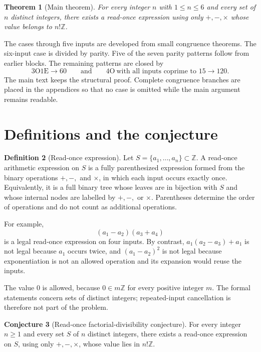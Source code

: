 \documentclass[11pt]{amsart}
\newtheorem{theorem}{Theorem}[section]
\theoremstyle{definition}
\newtheorem{definition}[theorem]{Definition}
\newtheorem{conjecture}[theorem]{Conjecture}
\theoremstyle{remark}
\newcommand{\Z}{\mathbb Z}
\newcommand{\OO}{\mathrm O}
\newcommand{\EE}{\mathrm E}
\begin{document}
\begin{theorem}[Main theorem]\label{thm:main}
For every integer $n$ with $1\le n\le6$ and every set of $n$ distinct
integers, there exists a read-once expression using only $+,-,\times$ whose
value belongs to $n!\Z$.
\end{theorem}

The cases through five inputs are developed from small congruence theorems.
The six-input case is divided by parity.  Five of the seven parity patterns
follow from earlier blocks.  The remaining patterns are closed by
\[
  3\OO1\EE\to 60
  \qquad\text{and}\qquad
  4\OO\ \text{with all inputs coprime to }15\to120.
\]
The main text keeps the structural proof.  Complete congruence branches are
placed in the appendices so that no case is omitted while the main argument
remains readable.

\section{Definitions and the conjecture}

\begin{definition}[Read-once expression]
Let $S=\{a_1,\dots,a_n\}\subset\Z$.  A read-once arithmetic expression on
$S$ is a fully parenthesized expression formed from the binary operations
$+,-,$ and $\times$, in which each input occurs exactly once.  Equivalently,
it is a full binary tree whose leaves are in bijection with $S$ and whose
internal nodes are labelled by $+,-,$ or $\times$.  Parentheses determine
the order of operations and do not count as additional operations.
\end{definition}

For example,
\[
 (a_1-a_2)(a_3+a_4)
\]
is a legal read-once expression on four inputs.  By contrast,
$a_1(a_2-a_3)+a_1$ is not legal because $a_1$ occurs twice, and
$(a_1-a_2)^2$ is not legal because exponentiation is not an allowed
operation and its expansion would reuse the inputs.

The value $0$ is allowed, because $0\in m\Z$ for every positive integer $m$.
The formal statements concern sets of distinct integers; repeated-input
cancellation is therefore not part of the problem.

\begin{conjecture}[Read-once factorial-divisibility conjecture]\label{conj:factorial}
For every integer $n\ge1$ and every set $S$ of $n$ distinct integers, there
exists a read-once expression on $S$, using only $+,-,\times$, whose value
lies in $n!\Z$.
\end{conjecture}
\end{document}
